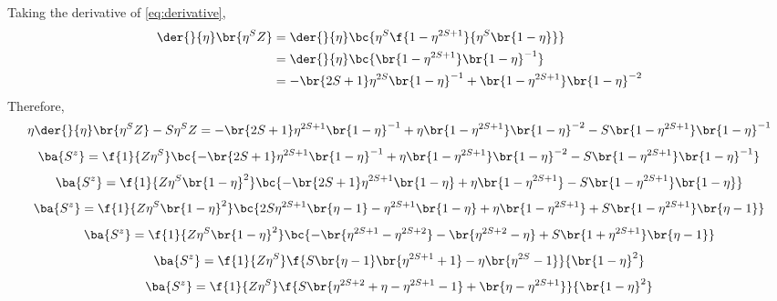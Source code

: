 \documentclass{article}
\begin{document}
Taking the derivative of \cref{eq:derivative},
\begin{align*}
\der{}{\eta}\br{\eta^{S}Z}
&= \der{}{\eta}\bc{\eta^{S}\f{1- \eta^{2S+1}}{\eta^{S}\br{1 - \eta}}} \\
&= \der{}{\eta}\bc{\br{1- \eta^{2S+1}}\br{1 - \eta}^{-1}} \\
&= - \br{2S+1}\eta^{2S}\br{1 - \eta}^{-1} + \br{1- \eta^{2S+1}}\br{1 - \eta}^{-2} \\
\end{align*}
Therefore,
\[ \eta\der{}{\eta}\br{\eta^{S}Z} - S\eta^{S}Z = - \br{2S+1}\eta^{2S+1}\br{1 - \eta}^{-1} + \eta\br{1- \eta^{2S+1}}\br{1 - \eta}^{-2} - S\br{1- \eta^{2S+1}}\br{1 - \eta}^{-1}  \]
\[ \ba{S^z} = \f{1}{Z\eta^{S}}\bc{- \br{2S+1}\eta^{2S+1}\br{1 - \eta}^{-1} + \eta\br{1- \eta^{2S+1}}\br{1 - \eta}^{-2} - S\br{1- \eta^{2S+1}}\br{1 - \eta}^{-1}}  \]
\[ \ba{S^z} = \f{1}{Z\eta^{S} \br{1 - \eta}^2}\bc{- \br{2S+1}\eta^{2S+1}\br{1 - \eta} + \eta\br{1- \eta^{2S+1}} - S\br{1- \eta^{2S+1}}\br{1 - \eta}}  \]
\[ \ba{S^z} = \f{1}{Z\eta^{S} \br{1 - \eta}^2}\bc{2S\eta^{2S+1}\br{\eta-1} - \eta^{2S+1}\br{1 - \eta} + \eta\br{1- \eta^{2S+1}} + S\br{1- \eta^{2S+1}}\br{\eta - 1}}  \]
\[ \ba{S^z} = \f{1}{Z\eta^{S} \br{1 - \eta}^2}\bc{- \br{\eta^{2S+1} - \eta^{2S+2}} - \br{\eta^{2S+2} - \eta} + S\br{1 + \eta^{2S+1}}\br{\eta - 1}}  \]
\[ \ba{S^z} = \f{1}{Z\eta^{S}} \f{S\br{\eta-1}\br{\eta^{2S+1} + 1} - \eta\br{\eta^{2S} - 1}}{\br{1 - \eta}^2} \]
\[ \ba{S^z} = \f{1}{Z\eta^{S}} \f{S\br{\eta^{2S+2} + \eta - \eta^{2S+1} - 1} + \br{\eta - \eta^{2S+1}}}{\br{1 - \eta}^2} \]
\end{document}
